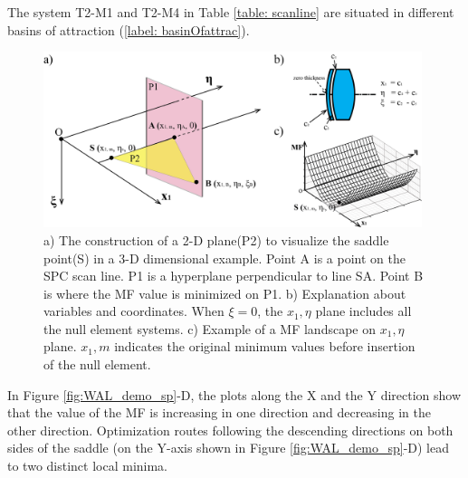 The system T2-M1 and T2-M4 in Table \ref{table: scanline} are situated in different basins of attraction (\ref{label: basinOfattrac}).  

\begin{figure}[h!]
    \centering
    \includegraphics[width=0.985\textwidth]{chapter-4/figures/hyperplane.png}
    \caption{ a) The construction of a 2-D plane(P2) to visualize the saddle point(S) in a 3-D dimensional example. Point A is a point on the SPC scan line. P1 is a hyperplane perpendicular to line SA. Point B is where the MF value is minimized on P1. b) Explanation about variables and coordinates. When $\xi = 0$, the $x_1, \eta$ plane includes all the null element systems. c) Example of a MF landscape on  $x_1, \eta$  plane. $x_1,m$ indicates the original minimum values before insertion of the null element.}
    \label{fig:hyperplane}
\end{figure}
In Figure \ref{fig:WAL_demo_sp}-D, the plots along the X and the Y direction show that the value of the MF is increasing in one direction and decreasing in the other direction. Optimization routes following the descending directions on both sides of the saddle (on the Y-axis shown in Figure \ref{fig:WAL_demo_sp}-D) lead to two distinct local minima.


